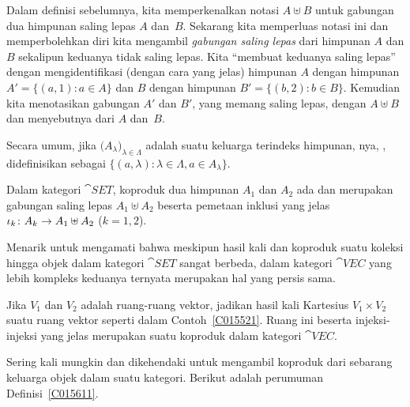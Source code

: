 \begin{defn} Dalam definisi sebelumnya, kita memperkenalkan notasi $A \uplus B$ untuk
gabungan dua himpunan saling lepas $A$ dan~$B$. Sekarang kita memperluas notasi ini dan memperbolehkan
diri kita mengambil \emph{gabungan saling lepas} dari himpunan $A$ dan $B$ sekalipun keduanya tidak
saling lepas. Kita ``membuat keduanya saling lepas'' dengan mengidentifikasi (dengan cara yang jelas) himpunan $A$ dengan
himpunan $A' = \{(a,1)\colon a \in A\}$ dan $B$ dengan himpunan $B' = \{(b,2)\colon b \in B\}$. Kemudian kita
menotasikan gabungan $A'$ dan $B'$, yang memang saling lepas, dengan $A \uplus B$ dan menyebutnya
 dari $A$ dan~$B$.

Secara umum, jika $\bigl(A_\lambda\bigr)_{\lambda \in \Lambda}$ adalah suatu keluarga terindeks
himpunan,
nya, , didefinisikan sebagai
$\{(a,\lambda)\colon \lambda \in \Lambda, a \in A_\lambda\}$.
\end{defn}

\begin{exam}\label{C015617} Dalam kategori $\cat{SET}$,
koproduk dua himpunan $A_1$ dan $A_2$ ada dan merupakan gabungan saling lepas $A_1 \uplus A_2$
beserta pemetaan inklusi yang jelas $\iota_k\colon A_k  \rightarrow A_1 \uplus A_2$ ($k = 1,2$).
\end{exam}

Menarik untuk mengamati bahwa meskipun hasil kali dan koproduk suatu koleksi hingga
objek dalam kategori $\cat{SET}$ sangat berbeda, dalam kategori $\cat{VEC}$ yang lebih kompleks
keduanya ternyata merupakan hal yang persis sama.

\begin{exam} Jika $V_1$ dan $V_2$ adalah ruang-ruang vektor, jadikan hasil kali Kartesius $V_1 \times V_2$
suatu ruang vektor seperti dalam Contoh~\ref{C015521}. Ruang ini beserta
injeksi-injeksi yang jelas merupakan suatu
koproduk dalam kategori $\cat{VEC}$.
\end{exam}

Sering kali mungkin dan dikehendaki untuk mengambil koproduk dari sebarang keluarga objek
dalam suatu kategori. Berikut adalah perumuman Definisi~\ref{C015611}.

